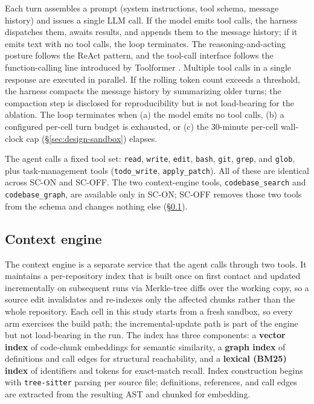 Each turn assembles a prompt (system instructions, tool schema, message history)
and issues a single LLM call. If the model emits tool calls, the harness
dispatches them, awaits results, and appends them to the message history; if it
emits text with no tool calls, the loop terminates. The reasoning-and-acting
posture follows the ReAct \citep{react2023} pattern, and the tool-call interface
follows the function-calling line introduced by Toolformer \citep{toolformer2023}.
Multiple tool calls in a single response are executed in parallel. If the rolling token count exceeds a
threshold, the harness compacts the message history by summarizing older turns;
the compaction step is disclosed for reproducibility but is not load-bearing for
the ablation. The loop terminates when (a) the model emits no tool calls,
(b) a configured per-cell turn budget is exhausted, or (c) the 30-minute
per-cell wall-clock cap (\S\ref{sec:design-sandbox}) elapses.

The agent calls a fixed tool set: \texttt{read}, \texttt{write}, \texttt{edit},
\texttt{bash}, \texttt{git}, \texttt{grep}, and \texttt{glob}, plus task-management
tools (\texttt{todo\_write}, \texttt{apply\_patch}). All of these are identical
across SC-ON and SC-OFF. The two context-engine tools, \texttt{codebase\_search}
and \texttt{codebase\_graph}, are available only in SC-ON; SC-OFF removes those
two tools from the schema and changes nothing else
(\S\ref{sec:system-engine}).

\subsection{Context engine}
\label{sec:system-engine}

The context engine is a separate service that the agent calls through two tools.
It maintains a per-repository index that is built once on first contact and
updated incrementally on subsequent runs via Merkle-tree diffs over the working
copy, so a source edit invalidates and re-indexes only the affected chunks
rather than the whole repository. Each cell in this study starts from a fresh
sandbox, so every arm exercises the build path; the incremental-update path is
part of the engine but not load-bearing in the run. The index has three
components: a \textbf{vector index} of code-chunk embeddings for semantic
similarity, a \textbf{graph index} of definitions and call edges for structural
reachability, and a \textbf{lexical (BM25) index} of identifiers and tokens for
exact-match recall. Index construction begins with \texttt{tree-sitter} parsing
per source file; definitions, references, and call edges are extracted from the
resulting AST and chunked for embedding.

